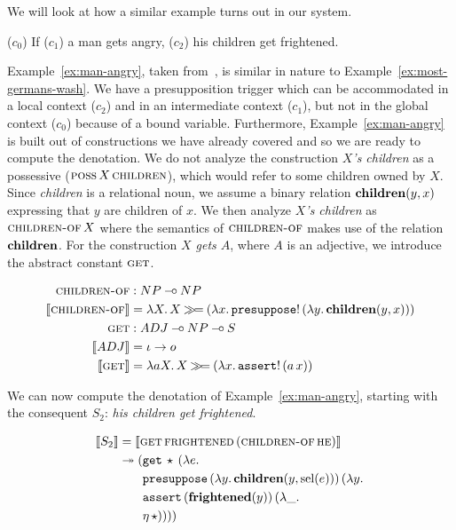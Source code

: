 We will look at how a similar example turns out in our system.

\begin{exe}
  \ex \label{ex:man-angry} ($c_0$) If ($c_1$) a man gets angry, ($c_2$) his
  children get frightened.
\end{exe}

Example~\ref{ex:man-angry}, taken from~\cite{van1992presupposition}, is
similar in nature to Example~\ref{ex:most-germans-wash}. We have a
presupposition trigger which can be accommodated in a local context ($c_2$)
and in an intermediate context ($c_1$), but not in the global context
($c_0$) because of a bound variable. Furthermore,
Example~\ref{ex:man-angry} is built out of constructions we have already
covered and so we are ready to compute the denotation. We do not analyze
the construction \emph{$X$'s children} as a possessive
($\textsc{poss}\,X\,\textsc{children}$), which would refer to some children
owned by $X$. Since \emph{children} is a relational noun, we assume a
binary relation $\textbf{children}(y, x)$ expressing that $y$ are children of
$x$. We then analyze \emph{$X$'s children} as $\textsc{children-of}\,X$
where the semantics of $\textsc{children-of}$ makes use of the relation
$\textbf{children}$. For the construction \emph{$X$ gets $A$}, where $A$ is an
adjective, we introduce the abstract constant $\textsc{get}$.

\begin{align*}
  \textsc{children-of} &: NP \mathbin{{-}\mkern-3.5mu{\circ}} NP \\
  \llbracket \textsc{children-of} \rrbracket &= \lambda X.\, X \mathbin{\gg\!=} (\lambda x.\, \mathtt{presuppose}!\,(\lambda y.\, \textbf{children}(y, x))) \\
  \textsc{get} &: ADJ \mathbin{{-}\mkern-3.5mu{\circ}} NP \mathbin{{-}\mkern-3.5mu{\circ}} S \\
  \llbracket ADJ \rrbracket &= \iota \to o \\
  \llbracket \textsc{get} \rrbracket &= \lambda a X.\, X \mathbin{\gg\!=} (\lambda x.\, \mathtt{assert}!\,(a\,x))
\end{align*}

We can now compute the denotation of Example~\ref{ex:man-angry}, starting
with the consequent $S_2$: \emph{his children get frightened}.

\begin{align*}
  \llbracket S_2 \rrbracket
  &= \llbracket \textsc{get}\,\textsc{frightened}\,(\textsc{children-of}\,\textsc{he}) \rrbracket \\
  &\twoheadrightarrow 
    \begin{aligned}[t]
      (&\mathtt{get}\,\star\,(\lambda e.\,  \\
       &\mathtt{presuppose}\,(\lambda y.\, \textbf{children}(y, \operatorname{sel}(e)))\,(\lambda y.\,  \\
       &\mathtt{assert}\,(\textbf{frightened}(y))\,(\lambda \_.\,  \\
       &\eta\,\star))))
    \end{aligned}
\end{align*}


